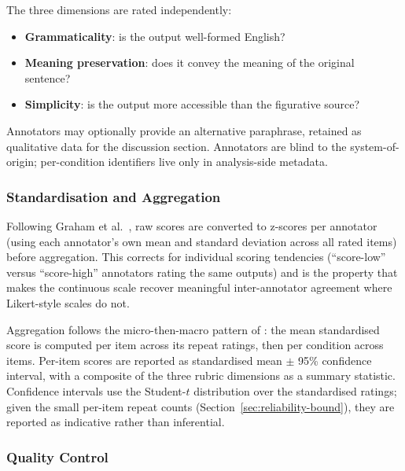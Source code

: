 The three dimensions are rated independently:
\begin{itemize}
    \item \textbf{Grammaticality}: is the output well-formed English?
    \item \textbf{Meaning preservation}: does it convey the meaning of the original sentence?
    \item \textbf{Simplicity}: is the output more accessible than the figurative source?
\end{itemize}
Annotators may optionally provide an alternative paraphrase, retained as qualitative data for the discussion section. Annotators are blind to the system-of-origin; per-condition identifiers live only in analysis-side metadata.

\subsubsection{Standardisation and Aggregation}

Following Graham et al.\ \cite{Graham2013}, raw scores are converted to z-scores per annotator (using each annotator's own mean and standard deviation across all rated items) before aggregation. This corrects for individual scoring tendencies (``score-low'' versus ``score-high'' annotators rating the same outputs) and is the property that makes the continuous scale recover meaningful inter-annotator agreement where Likert-style scales do not.

Aggregation follows the micro-then-macro pattern of \cite{Graham2017}: the mean standardised score is computed per item across its repeat ratings, then per condition across items. Per-item scores are reported as standardised mean $\pm$ 95\% confidence interval, with a composite of the three rubric dimensions as a summary statistic. Confidence intervals use the Student-$t$ distribution over the standardised ratings; given the small per-item repeat counts (Section~\ref{sec:reliability-bound}), they are reported as indicative rather than inferential.

\subsubsection{Quality Control}

